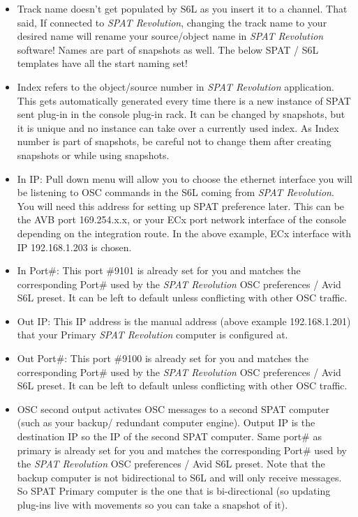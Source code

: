\documentclass[
  letterpaper,
  DIV=11,
  numbers=noendperiod]{scrreport}
\begin{document}
\begin{itemize}
\item
  Track name doesn't get populated by S6L as you insert it to a channel.
  That said, If connected to \emph{SPAT Revolution}, changing the track
  name to your desired name will rename your source/object name in
  \emph{SPAT Revolution} software! Names are part of snapshots as well.
  The below SPAT / S6L templates have all the start naming set!
\item
  Index refers to the object/source number in \emph{SPAT Revolution}
  application. This gets automatically generated every time there is a
  new instance of SPAT sent plug-in in the console plug-in rack. It can
  be changed by snapshots, but it is unique and no instance can take
  over a currently used index. As Index number is part of snapshots, be
  careful not to change them after creating snapshots or while using
  snapshots.
\item
  In IP: Pull down menu will allow you to choose the ethernet interface
  you will be listening to OSC commands in the S6L coming from
  \emph{SPAT Revolution}. You will need this address for setting up SPAT
  preference later. This can be the AVB port 169.254.x.x, or your ECx
  port network interface of the console depending on the integration
  route. In the above example, ECx interface with IP 192.168.1.203 is
  chosen.
\item
  In Port\#: This port \#9101 is already set for you and matches the
  corresponding Port\# used by the \emph{SPAT Revolution} OSC
  preferences / Avid S6L preset. It can be left to default unless
  conflicting with other OSC traffic.
\item
  Out IP: This IP address is the manual address (above example
  192.168.1.201) that your Primary \emph{SPAT Revolution} computer is
  configured at.
\item
  Out Port\#: This port \#9100 is already set for you and matches the
  corresponding Port\# used by the \emph{SPAT Revolution} OSC
  preferences / Avid S6L preset. It can be left to default unless
  conflicting with other OSC traffic.
\item
  OSC second output activates OSC messages to a second SPAT computer
  (such as your backup/ redundant computer engine). Output IP is the
  destination IP so the IP of the second SPAT computer. Same port\# as
  primary is already set for you and matches the corresponding Port\#
  used by the \emph{SPAT Revolution} OSC preferences / Avid S6L preset.
  Note that the backup computer is not bidirectional to S6L and will
  only receive messages. So SPAT Primary computer is the one that is
  bi-directional (so updating plug-ins live with movements so you can
  take a snapshot of it).
\end{itemize}
\end{document}
